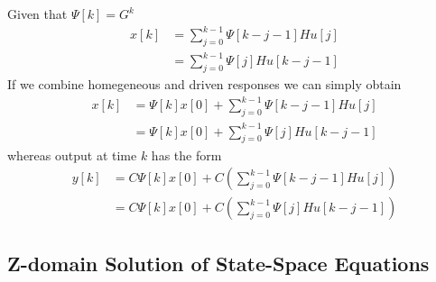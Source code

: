 \documentclass[twoside]{article}
\begin{document}
%
Given that $\Psi[k] = G^k$
%
\begin{align*}
    x[k] &= \sum\limits_{j = 0}^{k-1} \Psi[k-j-1] H u[j]
\\
&= \sum\limits_{j = 0}^{k-1} \Psi[j] H u[k-j-1]
\end{align*}
%
If we combine homegeneous and driven responses we can simply obtain
%
\begin{align*}
    x[k] &= \Psi[k] x[0] + \sum\limits_{j = 0}^{k-1} \Psi[k-j-1] H u[j]
\\
&= \Psi[k] x[0] + \sum\limits_{j = 0}^{k-1} \Psi[j] H u[k-j-1]
\end{align*}
% 
whereas output at time $k$ has the form
%
\begin{align*}
    y[k] &= C \Psi[k] x[0] + C \left( \sum\limits_{j = 0}^{k-1}
           \Psi[k-j-1] H u[j] \right) 
\\
&= C \Psi[k] x[0] + C \left( \sum\limits_{j = 0}^{k-1} \Psi[j] H
  u[k-j-1] \right) 
\end{align*}
% 

\subsection*{Z-domain Solution of State-Space Equations}
\end{document}
